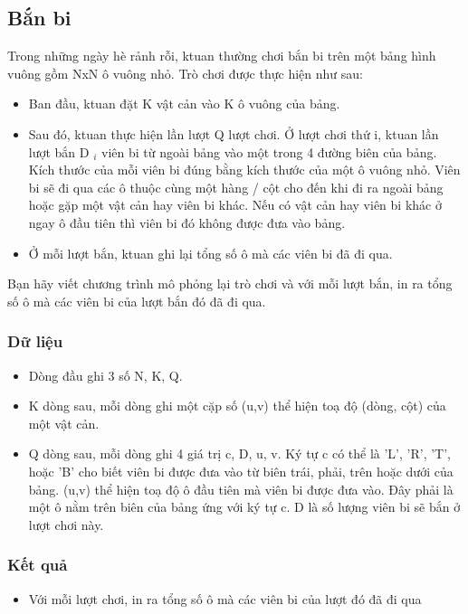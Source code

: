 







\subsection{   Bắn bi  }

   Trong những ngày hè rảnh rỗi, ktuan thường chơi bắn bi trên một bảng hình vuông gồm NxN ô vuông nhỏ. Trò chơi được thực hiện như sau:  
\begin{itemize}
	\item     Ban đầu, ktuan đặt K vật cản vào K ô vuông của bảng.   
	\item     Sau đó, ktuan thực hiện lần lượt Q lượt chơi. Ở lượt chơi thứ i, ktuan lần lượt bắn D    $_     i    $    viên bi từ ngoài bảng vào một trong 4 đường biên của bảng. Kích thước của mỗi viên bi đúng bằng kích thước của một ô vuông nhỏ. Viên bi sẽ đi qua các ô thuộc cùng một hàng / cột cho đến khi đi ra ngoài bảng hoặc gặp một vật cản hay viên bi khác. Nếu có vật cản hay viên bi khác ở ngay ô đầu tiên thì viên bi đó không được đưa vào bảng.   
	\item     Ở mỗi lượt bắn, ktuan ghi lại tổng số ô mà các viên bi đã đi qua.   
\end{itemize}

   Bạn hãy viết chương trình mô phỏng lại trò chơi và với mỗi lượt bắn, in ra tổng số ô mà các viên bi của lượt bắn đó đã đi qua.  

\subsubsection{   Dữ liệu  }
\begin{itemize}
	\item     Dòng đầu ghi 3 số N, K, Q.   
	\item     K dòng sau, mỗi dòng ghi một cặp số (u,v) thể hiện toạ độ (dòng, cột) của một vật cản.   
	\item     Q dòng sau, mỗi dòng ghi 4 giá trị c, D, u, v. Ký tự c có thể là 'L', 'R', 'T', hoặc 'B' cho biết viên bi được đưa vào từ biên trái, phải, trên hoặc dưới của bảng. (u,v) thể hiện toạ độ ô đầu tiên mà viên bi được đưa vào. Đây phải là một ô nằm trên biên của bảng ứng với ký tự c. D là số lượng viên bi sẽ bắn ở lượt chơi này.   
\end{itemize}

\subsubsection{   Kết quả  }
\begin{itemize}
	\item     Với mỗi lượt chơi, in ra tổng số ô mà các viên bi của lượt đó đã đi qua   
\end{itemize}

